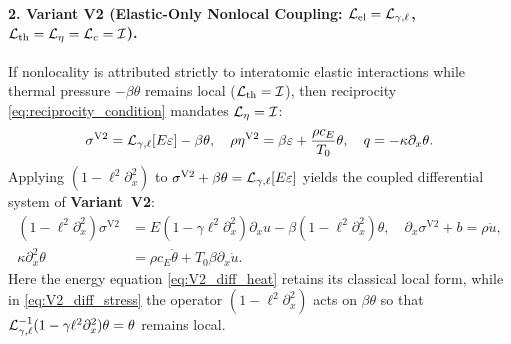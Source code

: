 \paragraph{2. Variant V2 (Elastic-Only Nonlocal Coupling: $\mathcal{L}_{\mathrm{el}} = \mathcal{L}_{\gamma,\ell}$, $\mathcal{L}_{\mathrm{th}} = \mathcal{L}_\eta = \mathcal{L}_c = \mathcal{I}$).}
If nonlocality is attributed strictly to interatomic elastic interactions \cite{BazantJirasek2002,Romano2017,MikhasevNobili2020,NobiliPramanik2025b} while thermal pressure $-\beta\theta$ remains local ($\mathcal{L}_{\mathrm{th}} = \mathcal{I}$), then reciprocity \eqref{eq:reciprocity_condition} mandates $\mathcal{L}_\eta = \mathcal{I}$:
\begin{equation}\label{eq:V2_integral}
  \sigma^{\mathrm{V2}} = \mathcal{L}_{\gamma,\ell}[E\varepsilon] - \beta\theta, \quad
  \rho\eta^{\mathrm{V2}} = \beta\varepsilon + \frac{\rho c_E}{T_0}\theta, \quad
  q = -\kappa\partial_x\theta.
\end{equation}
Applying $(1-\ell^2\partial_x^2)$ to $\sigma^{\mathrm{V2}} + \beta\theta = \mathcal{L}_{\gamma,\ell}[E\varepsilon]$ yields the coupled differential system of \textbf{Variant~V2}:
\begin{align}
  (1 - \ell^2\partial_x^2)\sigma^{\mathrm{V2}} &= E(1 - \gamma\ell^2\partial_x^2)\partial_x u - \beta(1 - \ell^2\partial_x^2)\theta, \quad
  \partial_x\sigma^{\mathrm{V2}} + b = \rho\ddot{u}, \label{eq:V2_diff_stress}\\
  \kappa\partial_x^2\theta &= \rho c_E\dot{\theta} + T_0\beta\partial_x\dot{u}. \label{eq:V2_diff_heat}
\end{align}
Here the energy equation \eqref{eq:V2_diff_heat} retains its classical local form, while in \eqref{eq:V2_diff_stress} the operator $(1-\ell^2\partial_x^2)$ acts on $\beta\theta$ so that $\mathcal{L}_{\gamma,\ell}^{-1}(1-\gamma\ell^2\partial_x^2)\theta = \theta$ remains local.
